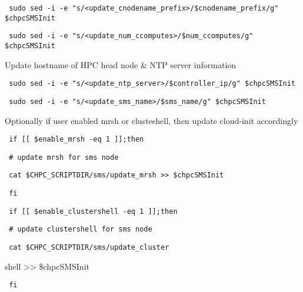 \documentclass[12pt]{article}
\begin{document}
\begin{bash}\texttt{\small{ sudo sed -i -e "s/<update\_cnodename\_prefix>/\${cnodename\_prefix}/g" \$chpcSMSInit}}\end{bash}
\begin{bash}\texttt{\small{ sudo sed -i -e "s/<update\_num\_ccomputes>/\${num\_ccomputes}/g" \$chpcSMSInit}}\end{bash}

Update hostname of HPC head node \& NTP server information

\begin{bash}\texttt{\small{ sudo sed -i -e "s/<update\_ntp\_server>/\${controller\_ip}/g" \$chpcSMSInit}}\end{bash}
\begin{bash}\texttt{\small{ sudo sed -i -e "s/<update\_sms\_name>/\${sms\_name}/g" \$chpcSMSInit}}\end{bash}

Optionally if user enabled mrsh or clusteshell, then update cloud-init accordingly

\begin{bash}\texttt{\small{ if [[ \${enable\_mrsh} -eq 1 ]];then}}\end{bash}
\begin{bash}\texttt{\small{    \# update mrsh for sms node}}\end{bash}
\begin{bash}\texttt{\small{    cat \$CHPC\_SCRIPTDIR/sms/update\_mrsh >> \$chpcSMSInit}}\end{bash}
\begin{bash}\texttt{\small{ fi}}\end{bash}
\begin{bash}\texttt{\small{ if [[ \${enable\_clustershell} -eq 1 ]];then}}\end{bash}
\begin{bash}\texttt{\small{    \# update clustershell for sms node}}\end{bash}
\begin{bash}\texttt{\small{    cat \$CHPC\_SCRIPTDIR/sms/update\_cluster}}\end{bash}shell >> \$chpcSMSInit
\begin{bash}\texttt{\small{ fi}}\end{bash}
\end{document}
